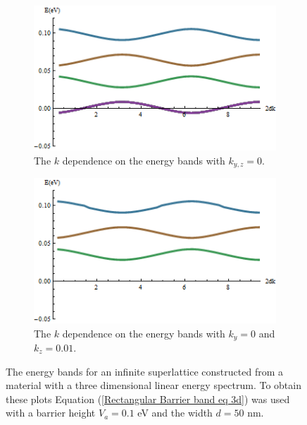 		\begin{figure}[h]
			 \begin{subfigure}[h]{0.5\textwidth}
				\centerline{\includegraphics[scale=0.6]{images/energy-bands-0}}
				\caption{The $k$ dependence on the energy bands with $k_{y,z}=0$.}
			\end{subfigure}
			\hspace{0.5cm}
			\begin{subfigure}[h]{0.5\textwidth}
				\centerline{\includegraphics[scale=0.6]{images/energy-bands-ky0}}
				\caption{The $k$ dependence on the energy bands with $k_{y}=0$ and $k_{z}=0.01$.}
			\end{subfigure}
			\caption{The energy bands for an infinite superlattice constructed from a material with a three dimensional linear energy spectrum. To obtain these plots Equation (\ref{Rectangular Barrier band eq 3d}) was used with a barrier height $V_{a}=0.1$ eV and the width $d=50$ nm.}
			\label{superlattice-bands-3d-ky}
		\end{figure}
